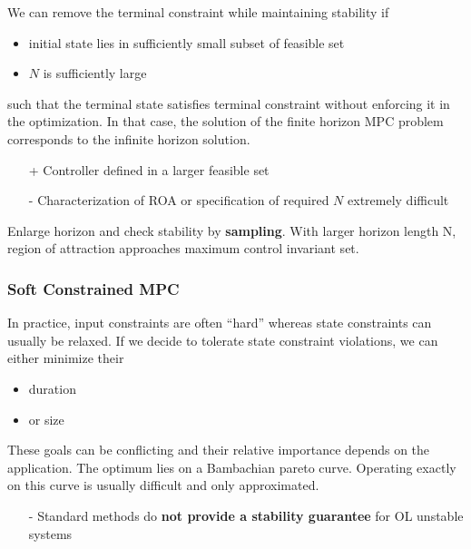 We can remove the terminal constraint while maintaining stability if
\begin{itemize}
    \item initial state lies in sufficiently small subset of feasible set
    \item $N$ is sufficiently large
\end{itemize}
such that the terminal state satisfies terminal constraint without enforcing it in the optimization.
\newpar{}
In that case, the solution of the finite horizon MPC problem corresponds to the infinite horizon solution.

\newpar{}

\begin{itemize}
    \item [+] Controller defined in a larger feasible set
    \item [-] Characterization of ROA or specification of required $N$ extremely difficult
\end{itemize}

\newpar{}

Enlarge horizon and check stability by \textbf{sampling}.
\newpar{}
With larger horizon length N, region of attraction approaches maximum control invariant set.

\subsubsection{Soft Constrained MPC}
In practice, input constraints are often ``hard'' whereas state constraints can usually be relaxed.
\newpar{}
If we decide to tolerate state constraint violations, we can either minimize their
\begin{itemize}
    \item duration
    \item or size
\end{itemize}
These goals can be conflicting and their relative importance depends on the application. The optimum lies on a Bambachian pareto curve. Operating exactly on this curve is usually difficult and only approximated. %

\newpar{}

\begin{itemize}
    \item [-] Standard methods do \textbf{not provide a stability guarantee} for OL unstable systems
\end{itemize}

